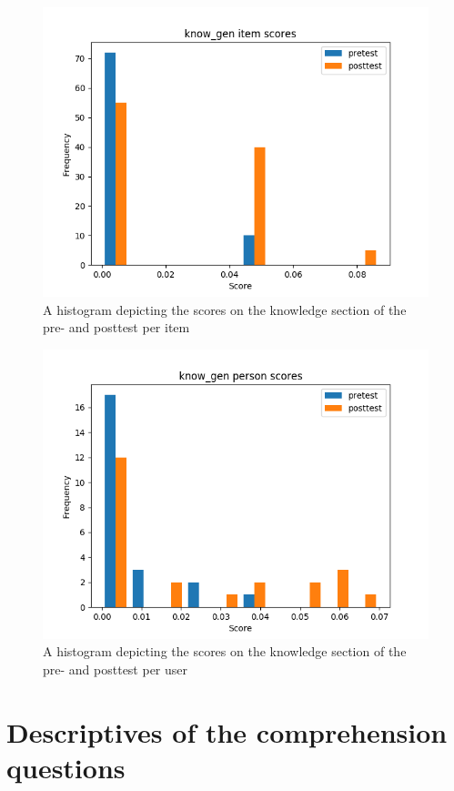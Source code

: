 \begin{figure}
    \centering
    \includegraphics[width=.7\textwidth]{img/know_gen_diff.png}
    \caption{A histogram depicting the scores on the knowledge section of the pre- and posttest per item}
    \label{fig:know_gen_diff}
\end{figure}
\begin{figure}
    \centering
    \includegraphics[width=.7\textwidth]{img/know_gen_abil.png}
    \caption{A histogram depicting the scores on the knowledge section of the pre- and posttest per user}
    \label{fig:know_gen_abil}
\end{figure}

\FloatBarrier
\section{Descriptives of the comprehension questions}

